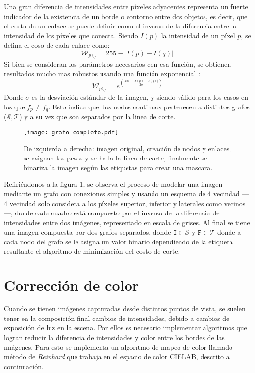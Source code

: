 Una gran diferencia de intensidades entre píxeles adyacentes representa un fuerte indicador de la existencia de un borde o contorno entre dos objetos, es decir, que el costo de un enlace se puede definir como el inverso de la diferencia entre la intensidad de los píxeles que conecta. Siendo $I(p)$ la intensidad de un píxel $p$, se defina el coso de cada enlace como:
\begin{equation}
\mathcal{W}_p,_q = 255 - |I(p) - I (q)|
\label{costo-corte}
\end{equation}
Si bien se consideran los parámetros necesarios con esa función, se obtienen resultados mucho mas robustos usando una función exponencial \cite{graph-opencv}:
\begin{equation}
\mathcal{W}_p,_q = e^{\left(\frac{255-|I(p) - I (q)|}{2 \sigma}  \right) }
\label{costo-corte}
\end{equation}
Donde $\sigma$ es la desviación estándar de la imagen, y siendo válido para los casos en los que $f_p \neq f_q$. Esto indica que dos nodos continuos pertenecen a distintos grafos ($\mathcal{S,T}$) y a su vez que son separados por la linea de corte.

\begin{figure}[h]
	\centering
	\texttt{[image: grafo-completo.pdf]}
	\caption[Corte por grafo]{De izquierda a derecha: imagen original, creación de nodos y enlaces, se asignan los pesos y se halla la linea de corte, finalmente se binariza la imagen según las etiquetas para crear una mascara.}
	\label{imagen:grafo}
\end{figure}

Refiriéndonos a la figura \ref{imagen:grafo}, se observa el proceso de modelar una imagen mediante un grafo con conexiones simples y usando un esquema de 4 vecindad --- 4 vecindad solo considera a los píxeles superior, inferior y laterales como vecinos ---, donde cada cuadro está compuesto por el inverso de la diferencia de intensidades entre dos imágenes, representado en escala de grises. Al final se tiene una imagen compuesta por dos grafos separados, donde $\mathtt{I} \in \mathcal{S}$ y $\mathtt{F} \in \mathcal{T}$ donde a cada nodo del grafo se le asigna un valor binario dependiendo de la etiqueta resultante el algoritmo de minimización del costo de corte.


\section{Corrección de color}\label{seccion-color}
Cuando se tienen imágenes capturadas desde distintos puntos de vista, se suelen tener en la composición final cambios de intensidades, debido a cambios de exposición de luz en la escena. Por ellos es necesario implementar algoritmos que logran reducir la diferencia de intensidades y color entre los bordes de las imágenes. Para esto se implementa un algoritmo de mapeo de color llamado método de \textit{Reinhard} \cite{reinhard} que trabaja en el espacio de color CIELAB, descrito a continuación. 

